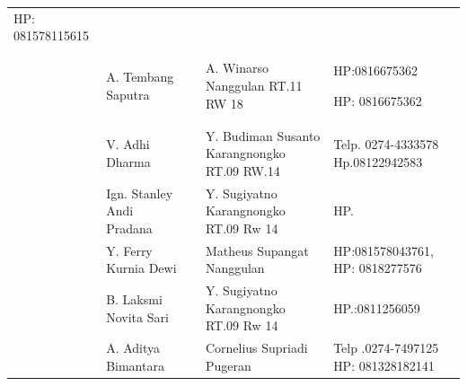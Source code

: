 \documentclass{article}
\begin{document}
\begin{flushleft}
\begin{supertabular}{m{0.7cm}m{4.0090003cm}m{1.3149999cm}m{4.118cm}m{0.17599998cm}}
HP: 081578115615\\
 &
A. Tembang Saputra &
 &
A. Winarso  Nanggulan RT.11 RW 18 &
HP:0816675362

HP: 0816675362\\
 &
V. Adhi Dharma &
 &
Y. Budiman Susanto Karangnongko RT.09 RW.14 &
Telp. 0274-4333578 Hp.08122942583\\
 &
Ign. Stanley Andi Pradana &
 &
Y. Sugiyatno  Karangnongko RT.09 Rw 14 &
HP.\\
 &
Y. Ferry Kurnia Dewi &
 &
Matheus Supangat  Nanggulan &
HP:081578043761,  HP: 0818277576\\
 &
B. Laksmi Novita Sari &
 &
Y. Sugiyatno  Karangnongko RT.09 Rw 14 &
HP.:0811256059\\
 &
A. Aditya Bimantara &
 &
Cornelius Supriadi  Pugeran &
Telp .0274-7497125  HP: 081328182141  


\end{supertabular}
\end{flushleft}
\end{document}
